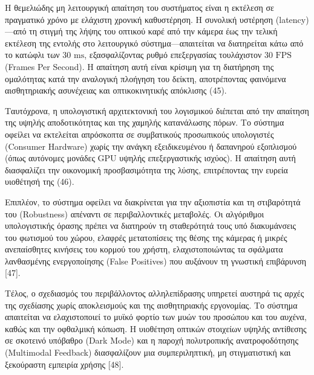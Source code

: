 \documentclass[twoside, a4paper, 11pt]{article}
\newcommand{\textlatin}[1]{\textenglish{#1}}
\begin{document}
Η θεμελιώδης μη λειτουργική απαίτηση του συστήματος είναι η εκτέλεση σε πραγματικό χρόνο με ελάχιστη χρονική καθυστέρηση. Η συνολική υστέρηση (\textlatin{latency})—από τη στιγμή της λήψης του οπτικού καρέ από την κάμερα έως την τελική εκτέλεση της εντολής 
στο λειτουργικό σύστημα—απαιτείται να διατηρείται κάτω από το κατώφλι των $30\text{ ms}$, εξασφαλίζοντας ρυθμό επεξεργασίας τουλάχιστον $30\text{ FPS}$ (\textlatin{Frames Per Second}). Η απαίτηση αυτή είναι κρίσιμη για τη διατήρηση της ομαλότητας κατά την αναλογική πλοήγηση του δείκτη, 
αποτρέποντας φαινόμενα αισθητηριακής ασυνέχειας και οπτικοκινητικής απόκλισης (45).

Ταυτόχρονα, η υπολογιστική αρχιτεκτονική του λογισμικού διέπεται από την απαίτηση της υψηλής αποδοτικότητας και της χαμηλής κατανάλωσης πόρων. 
Το σύστημα οφείλει να εκτελείται απρόσκοπτα σε συμβατικούς προσωπικούς υπολογιστές (\textlatin{Consumer Hardware}) χωρίς την ανάγκη εξειδικευμένου ή δαπανηρού εξοπλισμού (όπως αυτόνομες μονάδες GPU υψηλής επεξεργαστικής ισχύος).
Η απαίτηση αυτή διασφαλίζει την οικονομική προσβασιμότητα της λύσης, επιτρέποντας την ευρεία υιοθέτησή της (46).

Επιπλέον, το σύστημα οφείλει να διακρίνεται για την αξιοπιστία και τη στιβαρότητά του (\textlatin{Robustness}) απέναντι σε περιβαλλοντικές μεταβολές.
 Οι αλγόριθμοι υπολογιστικής όρασης πρέπει να διατηρούν τη σταθερότητά τους υπό διακυμάνσεις του φωτισμού του χώρου, ελαφρές μετατοπίσεις της θέσης της κάμερας ή μικρές ανεπαίσθητες κινήσεις του κορμού του χρήστη, ελαχιστοποιώντας 
 τα σφάλματα λανθασμένης ενεργοποίησης (\textlatin{False Positives}) που αυξάνουν τη γνωστική επιβάρυνση [47].

Τέλος, ο σχεδιασμός του περιβάλλοντος αλληλεπίδρασης υπηρετεί αυστηρά τις αρχές της σχεδίασης χωρίς αποκλεισμούς και της αισθητηριακής εργονομίας. 
Το σύστημα απαιτείται να ελαχιστοποιεί το μυϊκό φορτίο των μυών του προσώπου και του αυχένα, καθώς και την οφθαλμική κόπωση. Η υιοθέτηση οπτικών στοιχείων υψηλής αντίθεσης σε σκοτεινό υπόβαθρο (\textlatin{Dark Mode}) και η παροχή πολυτροπικής ανατροφοδότησης (\textlatin{Multimodal Feedback}) 
διασφαλίζουν μια συμπεριληπτική, μη στιγματιστική και ξεκούραστη εμπειρία χρήσης [48].
\end{document}
